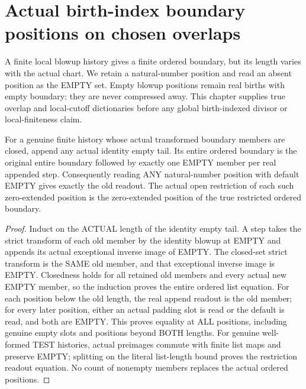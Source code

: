 \section{Actual birth-index boundary positions on chosen overlaps}

A finite local blowup history gives a finite ordered boundary, but its
length varies with the actual chart. We retain a natural-number position
and read an absent position as the EMPTY set. Empty blowup positions remain
real births with empty boundary; they are never compressed away. This
chapter supplies true overlap and local-cutoff dictionaries before any
global birth-indexed divisor or local-finiteness claim.

\begin{theorem}
\label{hir:sharp-actual-empty-padding-zero-extended-boundary}
\leanok
For a genuine finite history whose actual transformed boundary members are
closed, append any actual identity empty tail. Its entire ordered boundary
is the original entire boundary followed by exactly one EMPTY member per
real appended step. Consequently reading ANY natural-number position with
default EMPTY gives exactly the old readout. The actual open restriction
of each such zero-extended position is the zero-extended position of the
true restricted ordered boundary.
\end{theorem}
\begin{proof}
Induct on the ACTUAL length of the identity empty tail. A step takes the
strict transform of each old member by the identity blowup at EMPTY and
appends its actual exceptional inverse image of EMPTY. The closed-set strict
transform is the SAME old member, and that exceptional inverse image is
EMPTY. Closedness holds for all retained old members and every actual new
EMPTY member, so the induction proves the entire ordered list equation.
For each position below the old length, the real append readout is the old
member; for every later position, either an actual padding slot is read or
the default is read, and both are EMPTY. This proves equality at ALL
positions, including genuine empty slots and positions beyond BOTH lengths.
For genuine well-formed TEST histories, actual preimages commute with finite list maps and preserve EMPTY; splitting
on the literal list-length bound proves the restriction readout equation.
No count of nonempty members replaces the actual ordered positions.
\end{proof}

